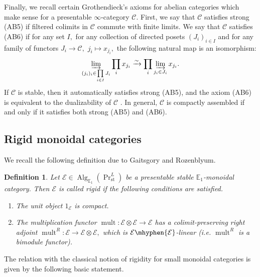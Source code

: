 \documentclass[11pt,leqno]{amsart}
\newtheorem{defi}[theo]{Definition}
\numberwithin{equation}{section}
\newcommand{\hy}{\mhyphen}
\newcommand{\indlim}[1][]{\mathop{\varinjlim}\limits_{#1}}
\newcommand{\prodd}[1][]{\mathop{\prod}\limits_{#1}}
\newcommand{\xto}{\xrightarrow}
\newcommand{\st}{\operatorname{st}}
\newcommand{\bE}{{\mathbb E}}
\newcommand{\cC}{{\mathcal C}}
\newcommand{\cE}{{\mathcal E}}
\newcommand{\Alg}{\operatorname{Alg}}
\newcommand{\mult}{\operatorname{mult}}
\begin{document}
Finally, we recall certain Grothendieck's axioms for abelian categories \cite{Gro} which make sense for a presentable $\infty$-category $\cC.$ First, we say that $\cC$ satisfies strong (AB5) if filtered colimits in $\cC$ commute with finite limits. We say that $\cC$ satisfies (AB6) if for any set $I,$ for any collection of directed posets $(J_i)_{i\in I}$ and for any family of functors $J_i\to \cC,$ $j_i\mapsto x_{j_i},$ the following natural map is an isomorphism:
\begin{equation*}
\indlim[(j_i)_i\in\prod\limits_{i\in I}J_i] \prodd[i]x_{j_i}\xto{\sim} \prodd[i]\indlim[j_i\in J_i]x_{j_i}.
\end{equation*}  
If $\cC$ is stable, then it automatically satisfies strong (AB5), and the axiom (AB6) is equivalent to the dualizability of $\cC$ \cite[Proposition 1.53]{E24}. In general, $\cC$ is compactly assembled if and only if it satisfies both strong (AB5) and (AB6).

\subsection{Rigid monoidal categories}
\label{ssec:rigid_cats}

We recall the following definition due to Gaitsgory and Rozenblyum.

\begin{defi}\cite[Definition 9.1.2]{GaRo17}\label{def:rigid_category}
Let $\cE\in\Alg_{\bE_1}(\Pr^L_{\st})$ be a presentable stable $\bE_1$-monoidal category. Then $\cE$ is called rigid if the following conditions are satisfied.

\begin{enumerate}[label=(\roman*), ref=(\roman*)]
	\item The unit object $1_{\cE}$ is compact.
	
	\item The multiplication functor $\mult:\cE\otimes\cE\to\cE$ has a colimit-preserving right adjoint $\mult^R:\cE\to\cE\otimes\cE,$ which is $\cE\hy\cE$-linear (i.e. $\mult^R$ is a bimodule functor).
\end{enumerate}
\end{defi}

The relation with the classical notion of rigidity for small monoidal categories is given by the following basic statement.
\end{document}
